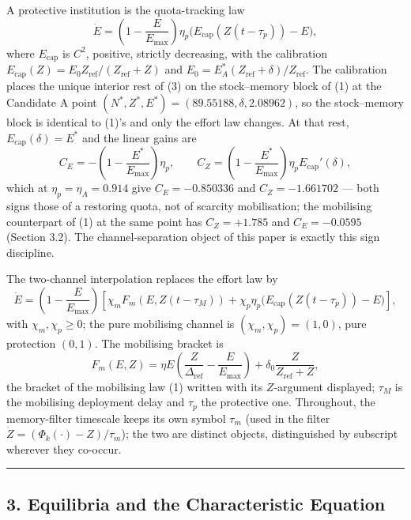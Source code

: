 \documentclass[11pt]{article}
\begin{document}
A protective institution is the quota-tracking law
\[\dot E = \left(1 - \frac{E}{E_{\max}}\right) \eta_p \bigl( E_{\mathrm{cap}}(Z(t - \tau_p)) - E \bigr), \tag{3}\]
where \(E_{\mathrm{cap}}\) is \(C^2\), positive, strictly decreasing,
with the calibration
\(E_{\mathrm{cap}}(Z) = E_0 Z_{\mathrm{ref}}/(Z_{\mathrm{ref}} + Z)\)
and \(E_0 = E^*_A(Z_{\mathrm{ref}} + \delta)/Z_{\mathrm{ref}}\). The
calibration places the unique interior rest of (3) on the stock--memory
block of (1) at the Candidate A point
\((N^*, Z^*, E^*) = (89.55188, \delta, 2.08962)\), so the stock--memory
block is identical to (1)'s and only the effort law changes. At that
rest, \(E_{\mathrm{cap}}(\delta) = E^*\) and the linear gains are
\[C_E = -\left(1 - \frac{E^*}{E_{\max}}\right)\eta_p, \qquad C_Z = \left(1 - \frac{E^*}{E_{\max}}\right)\eta_p E_{\mathrm{cap}}'(\delta),\]
which at \(\eta_p = \eta_A = 0.914\) give \(C_E = -0.850336\) and
\(C_Z = -1.661702\) --- both signs those of a restoring quota, not of
scarcity mobilisation; the mobilising counterpart of (1) at the same
point has \(C_Z = +1.785\) and \(C_E = -0.0595\) (Section 3.2). The
channel-separation object of this paper is exactly this sign discipline.

The two-channel interpolation replaces the effort law by
\[\dot E = \left(1 - \frac{E}{E_{\max}}\right)\left[ \chi_m F_m(E, Z(t-\tau_M)) + \chi_p \eta_p \bigl( E_{\mathrm{cap}}(Z(t-\tau_p)) - E \bigr) \right], \tag{4}\]
with \(\chi_m, \chi_p \ge 0\); the pure mobilising channel is
\((\chi_m, \chi_p) = (1, 0)\), pure protection \((0, 1)\). The
mobilising bracket is
\[F_m(E, Z) = \eta E\left( \frac{Z}{\Delta_{\mathrm{ref}}} - \frac{E}{E_{\max}} \right) + \delta_0 \frac{Z}{Z_{\mathrm{ref}} + Z},\]
the bracket of the mobilising law (1) written with its \(Z\)-argument
displayed; \(\tau_M\) is the mobilising deployment delay and \(\tau_p\)
the protective one. Throughout, the memory-filter timescale keeps its
own symbol \(\tau_m\) (used in the filter
\(\dot Z = (\Phi_k(\cdot) - Z)/\tau_m\)); the two are distinct objects,
distinguished by subscript wherever they co-occur.

\begin{center}\rule{0.5\linewidth}{0.5pt}\end{center}

\subsection{3. Equilibria and the Characteristic
Equation}\label{equilibria-and-the-characteristic-equation}
\end{document}
